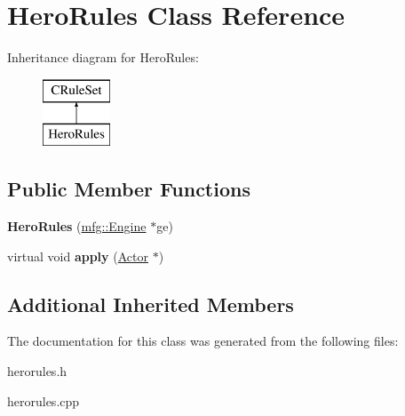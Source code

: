 \hypertarget{class_hero_rules}{}\section{Hero\+Rules Class Reference}
\label{class_hero_rules}
Inheritance diagram for Hero\+Rules\+:\begin{figure}[H]
\begin{center}
\leavevmode
\includegraphics[height=2.000000cm]{class_hero_rules}
\end{center}
\end{figure}
\subsection*{Public Member Functions}
\begin{DoxyCompactItemize}
\item 
\mbox{\label{class_hero_rules_a93fc8af4e87266175944bc917e5f3c42}} 
{\bfseries Hero\+Rules} (\hyperlink{classmfg_1_1_engine}{mfg\+::\+Engine} $\ast$ge)
\item 
\mbox{\label{class_hero_rules_a5e9001ef72079bf30525398c95acbd6e}} 
virtual void {\bfseries apply} (\hyperlink{class_actor}{Actor} $\ast$)
\end{DoxyCompactItemize}
\subsection*{Additional Inherited Members}


The documentation for this class was generated from the following files\+:\begin{DoxyCompactItemize}
\item 
herorules.\+h\item 
herorules.\+cpp\end{DoxyCompactItemize}
